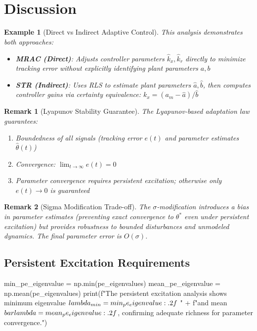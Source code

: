 \documentclass[a4paper, 11pt]{article}
\newtheorem{example}{Example}[section]
\newtheorem{remark}{Remark}[section]
\begin{document}
\section{Discussion}

\begin{example}[Direct vs Indirect Adaptive Control]
This analysis demonstrates both approaches:
\begin{itemize}
\item \textbf{MRAC (Direct)}: Adjusts controller parameters $\hat{k}_x, \hat{k}_r$ directly
to minimize tracking error without explicitly identifying plant parameters $a, b$
\item \textbf{STR (Indirect)}: Uses RLS to estimate plant parameters $\hat{a}, \hat{b}$,
then computes controller gains via certainty equivalence: $k_x = (a_m - \hat{a})/\hat{b}$
\end{itemize}
\end{example}

\begin{remark}[Lyapunov Stability Guarantee]
The Lyapunov-based adaptation law guarantees:
\begin{enumerate}
\item Boundedness of all signals (tracking error $e(t)$ and parameter estimates $\hat{\theta}(t)$)
\item Convergence: $\lim_{t \to \infty} e(t) = 0$
\item Parameter convergence requires persistent excitation; otherwise only $e(t) \to 0$ is guaranteed
\end{enumerate}
\end{remark}

\begin{remark}[Sigma Modification Trade-off]
The $\sigma$-modification introduces a bias in parameter estimates (preventing exact convergence
to $\theta^*$ even under persistent excitation) but provides robustness to bounded disturbances
and unmodeled dynamics. The final parameter error is $O(\sigma)$.
\end{remark}

\subsection{Persistent Excitation Requirements}

\begin{pycode}
min_pe_eigenvalue = np.min(pe_eigenvalues)
mean_pe_eigenvalue = np.mean(pe_eigenvalues)
print(f"The persistent excitation analysis shows minimum eigenvalue $\\lambda_{{\\min}} = {min_pe_eigenvalue:.2f}$ " +
      f"and mean $\\bar{{\\lambda}} = {mean_pe_eigenvalue:.2f}$, confirming adequate richness for parameter convergence.")
\end{pycode}
\end{document}
